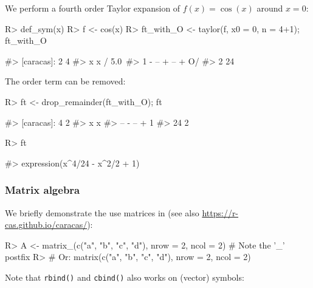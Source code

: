 We perform a fourth order Taylor expansion of \(f(x) = \cos(x)\) around
\(x = 0\):

\begin{Schunk}
\begin{Sinput}
R> def_sym(x)
R> f <- cos(x)
R> ft_with_O <- taylor(f, x0 = 0, n = 4+1); ft_with_O
\end{Sinput}
\begin{Soutput}
#> [caracas]:      2    4          
#>                x    x     / 5.0\
#>            1 - -- + -- + O\x   /
#>                2    24
\end{Soutput}
\end{Schunk}

The order term can be removed:

\begin{Schunk}
\begin{Sinput}
R> ft <- drop_remainder(ft_with_O); ft
\end{Sinput}
\begin{Soutput}
#> [caracas]:  4    2    
#>            x    x     
#>            -- - -- + 1
#>            24   2
\end{Soutput}
\begin{Sinput}
R> ft %
\end{Sinput}
\begin{Soutput}
#> expression(x^4/24 - x^2/2 + 1)
\end{Soutput}
\end{Schunk}

\hypertarget{matrix-algebra}{%
\subsubsection{Matrix algebra}\label{matrix-algebra}}

We briefly demonstrate the use matrices in \CRANpkg{caracas} (see also
\url{https://r-cas.github.io/caracas/}):

\begin{Schunk}
\begin{Sinput}
R> A <- matrix_(c("a", "b", "c", "d"), nrow = 2, ncol = 2) # Note the '_' postfix
R> # Or: matrix(c("a", "b", "c", "d"), nrow = 2, ncol = 2) %
\end{Sinput}
\end{Schunk}

Note that \texttt{rbind()} and \texttt{cbind()} also works on
 (vector) symbols:

